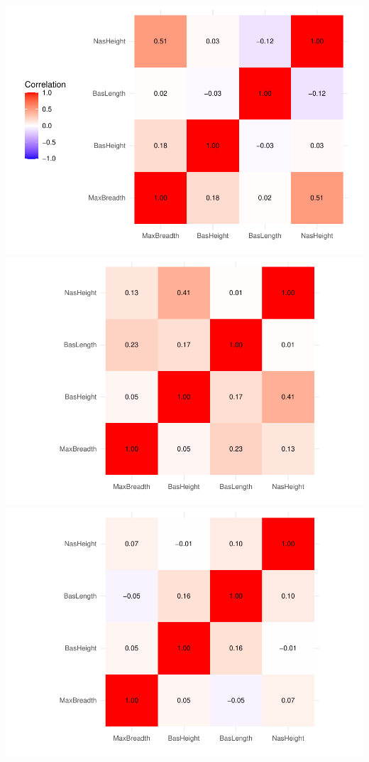 \documentclass[
]{article}
\begin{document}
\includegraphics{CA1_files/figure-latex/unnamed-chunk-6-1.pdf}
\includegraphics{CA1_files/figure-latex/unnamed-chunk-6-2.pdf}
\includegraphics{CA1_files/figure-latex/unnamed-chunk-6-3.pdf}
\end{document}
